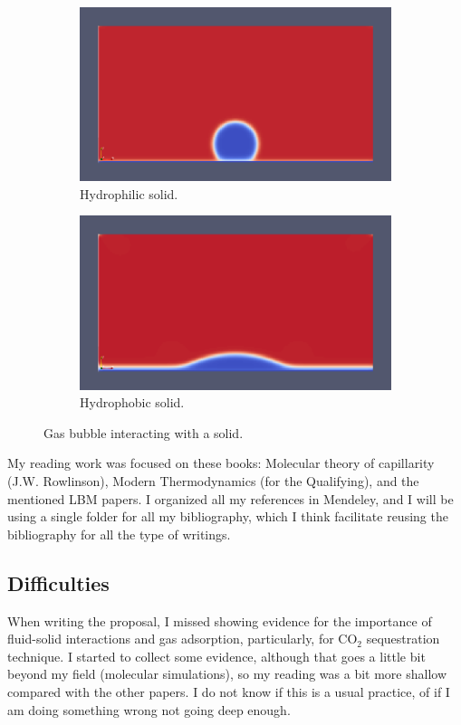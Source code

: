 \documentclass[12pt]{article}
\begin{document}
	\begin{figure}[h]
		\centering
		\begin{subfigure}{.5\textwidth}
			\centering
			\includegraphics[width=1\linewidth]{pics/solidForce.png}
			\caption{Hydrophilic solid.}
		\end{subfigure}%
		\begin{subfigure}{.5\textwidth}
			\centering
			\includegraphics[width=1\linewidth]{pics/solidForce2.png}
			\caption{Hydrophobic solid.}
		\end{subfigure}
		\caption{Gas bubble interacting with a solid.}
	\end{figure}
	My reading work was focused on these books: Molecular theory of capillarity (J.W. Rowlinson), Modern Thermodynamics (for the Qualifying), and the mentioned LBM papers. I organized all my references in Mendeley, and I will be using a single folder for all my bibliography, which I think facilitate reusing the bibliography for all the type of writings.  
	
	\subsection*{Difficulties}
	When writing the proposal, I missed showing evidence for the importance of fluid-solid interactions and gas adsorption, particularly, for CO$_2$ sequestration technique. I started to collect some evidence, although that goes a little bit beyond my field (molecular simulations), so my reading was a bit more shallow compared with the other papers. I do not know if this is a usual practice, of if I am doing something wrong not going deep enough. 
	
\end{document}
